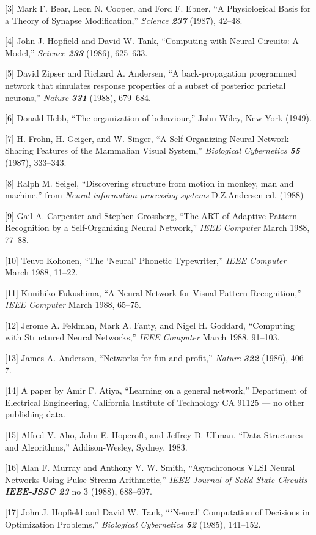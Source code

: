 \documentclass[12pt]{report}
\begin{document}
[3] Mark F. Bear, Leon N. Cooper, and Ford F. Ebner, ``A Physiological
Basis for a Theory of Synapse Modification,'' {\sl Science \bf237}
(1987), 42--48.

[4] John J. Hopfield and David W. Tank, ``Computing with Neural
Circuits: A Model,'' {\sl Science \bf233} (1986), 625--633.

[5] David Zipser and Richard A. Andersen, ``A back-propagation
programmed network that simulates response properties of a subset of
posterior parietal neurons,'' {\sl Nature \bf331} (1988), 679--684.

[6] Donald Hebb, ``The organization of behaviour,'' John Wiley, 
New York (1949).

[7] H. Frohn, H. Geiger, and W. Singer, ``A Self-Organizing Neural
Network Sharing Features of the Mammalian Visual System,'' {\sl
Biological Cybernetics \bf55} (1987), 333--343.

[8] Ralph M. Seigel, ``Discovering structure from motion in monkey, man
and machine,'' from {\sl Neural information processing systems}
D.Z.Andersen ed. (1988)

[9] Gail A. Carpenter and Stephen Grossberg, ``The ART of Adaptive
Pattern Recognition by a Self-Organizing Neural Network,'' {\sl IEEE
Computer} March 1988, 77--88.

[10] Teuvo Kohonen, ``The `Neural' Phonetic Typewriter,'' {\sl IEEE
Computer} March 1988, 11--22.

[11] Kunihiko Fukushima, ``A Neural Network for Visual Pattern
Recognition,'' {\sl IEEE Computer} March 1988, 65--75.

[12] Jerome A. Feldman, Mark A. Fanty, and Nigel H. Goddard, ``Computing
with Structured Neural Networks,'' {\sl IEEE Computer} March 1988,
91--103.

[13] James A. Anderson, ``Networks for fun and profit,'' {\sl Nature
\bf322} (1986), 406--7.

[14] A paper by Amir F. Atiya, ``Learning on a general network,'' Department
of Electrical Engineering, California Institute of Technology CA 91125
--- no other publishing data.

[15] Alfred V. Aho, John E. Hopcroft, and Jeffrey D. Ullman, ``Data
Structures and Algorithms,'' Addison-Wesley, Sydney, 1983.

[16] Alan F. Murray and Anthony V. W. Smith, ``Asynchronous VLSI Neural
Networks Using Pulse-Stream Arithmetic,'' {\sl IEEE Journal of
Solid-State Circuits \bf IEEE-JSSC 23} no 3 (1988), 688--697.

[17] John J. Hopfield and David W. Tank, ``\thinspace`Neural'
Computation of Decisions in Optimization Problems,'' {\sl Biological
Cybernetics \bf52} (1985), 141--152.
\end{document}
